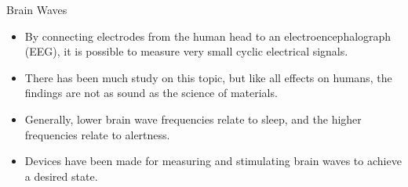 {\Large Brain Waves}
\begin{itemize}
\item By connecting electrodes from the human head to an electroencephalograph (EEG), it is possible to measure very small cyclic electrical signals.
\item There has been much study on this topic, but like all effects on humans, the findings are not as sound as the science of materials.
\item Generally, lower brain wave frequencies relate to sleep, and the higher frequencies relate to alertness.
\item Devices have been made for measuring and stimulating brain waves to achieve a desired state.
\end{itemize}
